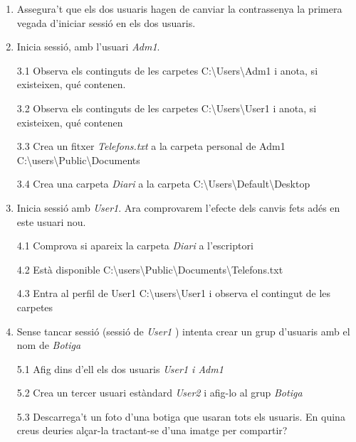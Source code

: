 \documentclass[
  a4paper,
]{article}
\begin{document}
\begin{enumerate}
\def\labelenumi{\arabic{enumi}.}
\setcounter{enumi}{1}
\item
  Assegura't que els dos usuaris hagen de canviar la contrassenya la
  primera vegada d'iniciar sessió en els dos usuaris.
\item
  Inicia sessió, amb l'usuari \emph{Adm1}.

  3.1 Observa els continguts de les carpetes
  C:\textbackslash Users\textbackslash Adm1 i anota, si existeixen, qué
  contenen.

  3.2 Observa els continguts de les carpetes
  C:\textbackslash Users\textbackslash User1 i anota, si existeixen, qué
  contenen

  3.3 Crea un fitxer \emph{Telefons.txt} a la carpeta personal de Adm1
  C:\textbackslash users\textbackslash Public\textbackslash Documents

  3.4 Crea una carpeta \emph{Diari} a la carpeta
  C:\textbackslash Users\textbackslash Default\textbackslash Desktop
\item
  Inicia sessió amb \emph{User1}. Ara comprovarem l'efecte dels canvis
  fets adés en este usuari nou.

  4.1 Comprova si apareix la carpeta \emph{Diari} a l'escriptori

  4.2 Està disponible
  C:\textbackslash users\textbackslash Public\textbackslash Documents\textbackslash Telefons.txt

  4.3 Entra al perfil de User1
  C:\textbackslash users\textbackslash User1 i observa el contingut de
  les carpetes
\item
  Sense tancar sessió (sessió de \emph{User1} ) intenta crear un grup
  d'usuaris amb el nom de \emph{Botiga}

  5.1 Afig dins d'ell els dos usuaris \emph{User1 i Adm1}

  5.2 Crea un tercer usuari estàndard \emph{User2} i afig-lo al grup
  \emph{Botiga}

  5.3 Descarrega't un foto d'una botiga que usaran tots els usuaris. En
  quina creus deuries alçar-la tractant-se d'una imatge per compartir?
\end{enumerate}
\end{document}
